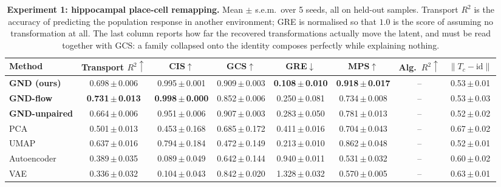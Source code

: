 \begin{table}[t]
\centering
\caption{\textbf{Experiment 1: hippocampal place-cell remapping.} Mean $\pm$ s.e.m.\ over 5 seeds, all on held-out samples. Transport $R^2$ is the accuracy of predicting the population response in another environment; GRE is normalised so that $1.0$ is the score of assuming no transformation at all. The last column reports how far the recovered transformations actually move the latent, and must be read together with GCS: a family collapsed onto the identity composes perfectly while explaining nothing.}
\label{tab:hippocampus}
\vspace{2pt}
\small
\begin{tabular}{lccccccc}
\toprule
Method & Transport $R^2\!\uparrow$ & CIS$\uparrow$ & GCS$\uparrow$ & GRE$\downarrow$ & MPS$\uparrow$ & Alg.\ $R^2\!\uparrow$ & $\|T_c-\mathrm{id}\|$ \\
\midrule
\textbf{GND (ours)} & 0.698\,\tiny{$\pm$\,0.006} & 0.995\,\tiny{$\pm$\,0.001} & 0.909\,\tiny{$\pm$\,0.003} & \textbf{0.108\,\tiny{$\pm$\,0.010}} & \textbf{0.918\,\tiny{$\pm$\,0.017}} & -- & 0.53\,\tiny{$\pm$\,0.01} \\
\textbf{GND-flow} & \textbf{0.731\,\tiny{$\pm$\,0.013}} & \textbf{0.998\,\tiny{$\pm$\,0.000}} & 0.852\,\tiny{$\pm$\,0.006} & 0.250\,\tiny{$\pm$\,0.081} & 0.734\,\tiny{$\pm$\,0.008} & -- & 0.53\,\tiny{$\pm$\,0.03} \\
\textbf{GND-unpaired} & 0.664\,\tiny{$\pm$\,0.006} & 0.951\,\tiny{$\pm$\,0.006} & 0.907\,\tiny{$\pm$\,0.003} & 0.283\,\tiny{$\pm$\,0.050} & 0.781\,\tiny{$\pm$\,0.013} & -- & 0.52\,\tiny{$\pm$\,0.02} \\
\midrule
PCA & 0.501\,\tiny{$\pm$\,0.013} & 0.453\,\tiny{$\pm$\,0.168} & 0.685\,\tiny{$\pm$\,0.172} & 0.411\,\tiny{$\pm$\,0.016} & 0.704\,\tiny{$\pm$\,0.043} & -- & 0.67\,\tiny{$\pm$\,0.02} \\
UMAP & 0.637\,\tiny{$\pm$\,0.016} & 0.794\,\tiny{$\pm$\,0.184} & 0.472\,\tiny{$\pm$\,0.149} & 0.213\,\tiny{$\pm$\,0.010} & 0.862\,\tiny{$\pm$\,0.048} & -- & 0.52\,\tiny{$\pm$\,0.01} \\
Autoencoder & 0.389\,\tiny{$\pm$\,0.035} & 0.089\,\tiny{$\pm$\,0.049} & 0.642\,\tiny{$\pm$\,0.144} & 0.940\,\tiny{$\pm$\,0.011} & 0.531\,\tiny{$\pm$\,0.032} & -- & 0.60\,\tiny{$\pm$\,0.02} \\
VAE & 0.336\,\tiny{$\pm$\,0.032} & 0.104\,\tiny{$\pm$\,0.043} & 0.842\,\tiny{$\pm$\,0.020} & 1.328\,\tiny{$\pm$\,0.032} & 0.570\,\tiny{$\pm$\,0.005} & -- & 0.63\,\tiny{$\pm$\,0.01} \\

\end{tabular}
\end{table}
